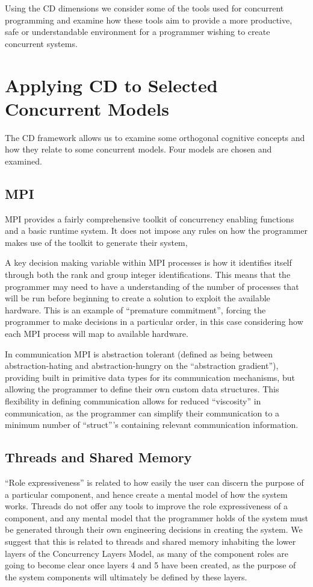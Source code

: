 \documentclass{sig-alternate}
\begin{document}
Using the CD dimensions we consider some of the tools used for concurrent programming and examine how these tools aim to provide a more productive, safe or understandable environment for a programmer wishing to create concurrent systems.

\section{Applying CD to Selected Concurrent Models}
The CD framework allows us to examine some orthogonal cognitive concepts and how they relate to some concurrent models. Four models are chosen and examined.

\subsection{MPI}
MPI provides a fairly comprehensive toolkit of concurrency enabling functions and a basic runtime system. It does not impose any rules on how the programmer makes use of the toolkit to generate their system, 

A key decision making variable within MPI processes is how it identifies itself through both the rank and group integer identifications. This means that the programmer may need to have a understanding of the number of processes that will be run before beginning to create a solution to exploit the available hardware. This is an example of ``premature commitment'', forcing the programmer to make decisions in a particular order, in this case considering how each MPI process will map to available hardware. 

In communication MPI is abstraction tolerant (defined as being between abstraction-hating and abstraction-hungry on the ``abstraction gradient''), providing built in primitive data types for its communication mechanisms, but allowing the programmer to define their own custom data structures. This flexibility in defining communication allows for reduced ``viscosity'' in communication, as the programmer can simplify their communication to a minimum number of ``struct'''s containing relevant communication information.

\subsection{Threads and Shared Memory}

``Role expressiveness'' is related to how easily the user can discern the purpose of a particular component, and hence create a mental model of how the system works. Threads do not offer any tools to improve the role expressiveness of a component, and any mental model that the programmer holds of the system must be generated through their own engineering decisions in creating the system. We suggest that this is related to threads and shared memory inhabiting the lower layers of the Concurrency Layers Model, as many of the component roles are going to become clear once layers 4 and 5 have been created, as the purpose of the system components will ultimately be defined by these layers.
\end{document}
